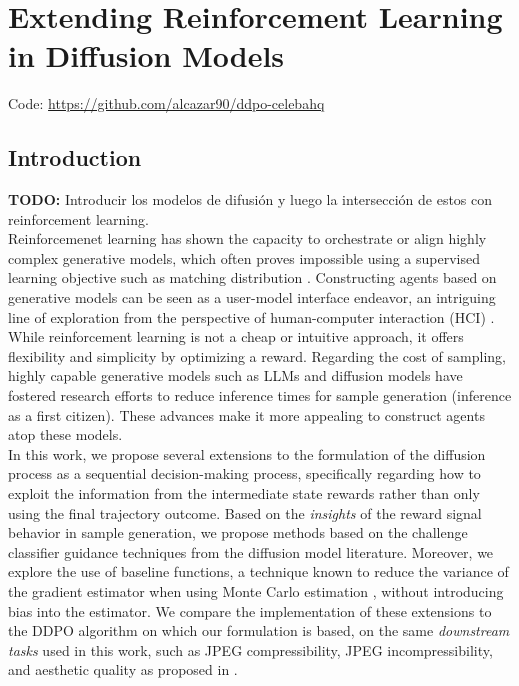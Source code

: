 \chapter{Extending Reinforcement Learning in Diffusion Models}

Code: \href{https://github.com/alcazar90/ddpo-celebahq}{https://github.com/alcazar90/ddpo-celebahq}

\section{Introduction}

\textbf{TODO:} Introducir los modelos de difusión y luego la intersección de
estos con reinforcement learning. \\

Reinforcemenet learning has shown the capacity to orchestrate or align highly complex generative models, which often proves impossible using a supervised learning objective such as matching distribution . Constructing agents based on generative models can be seen as a user-model interface endeavor, an intriguing line of exploration from the perspective of human-computer interaction (HCI) . While reinforcement learning is not a cheap or intuitive approach, it offers flexibility and simplicity by optimizing a reward. Regarding the cost of sampling, highly capable generative models such as LLMs and diffusion models have fostered research efforts to reduce inference times for sample generation (inference as a first citizen). These advances make it more appealing to construct agents atop these models. \\

In this work, we propose several extensions to the formulation of the diffusion process as a sequential decision-making process, specifically regarding how to exploit the information from the intermediate state rewards rather than only using the final trajectory outcome. Based on the \textit{insights} of the reward signal behavior in sample generation, we propose methods based on the challenge classifier guidance techniques from the diffusion model literature. Moreover, we explore the use of baseline functions, a technique known to reduce the variance of the gradient estimator when using Monte Carlo estimation \cite{mohamed2020monte}, without introducing bias into the estimator. We compare the implementation of these extensions to the DDPO algorithm \cite{black2023training} on which our formulation is based, on the same \textit{downstream tasks} used in this work, such as JPEG compressibility, JPEG incompressibility, and aesthetic quality as proposed in \cite{black2023training}. \\

